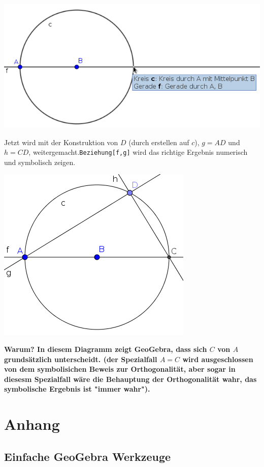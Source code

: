 \documentclass{article}
\begin{document}
\begin{enumerate}
\begin{enumerate}
\begin{center}
\includegraphics[scale=0.5]{limitations-Thales2-3-de}
\end{center}
      Jetzt wird mit der Konstruktion von  $D$ (durch erstellen auf $c$), $g=AD$ und $h=CD$, weitergemacht.\texttt{Beziehung[f,g]} wird das richtige Ergebnis numerisch und symbolisch zeigen.
\begin{center}
\includegraphics[scale=0.5]{limitations-Thales2-4}
\end{center}
      \textbf{Warum? In diesem Diagramm zeigt GeoGebra, dass sich $C$ von $A$ grundsätzlich unterscheidt. (der Spezialfall $A=C$ wird ausgeschlossen von dem symbolisichen Beweis zur Orthogonalität, aber sogar in diesesm Spezialfall wäre die Behauptung der Orthogonalität wahr, das symbolische Ergebnis ist "immer wahr").}
    \end{enumerate}
\end{enumerate}


\section{Anhang}
\subsection{Einfache GeoGebra Werkzeuge}
\end{document}
